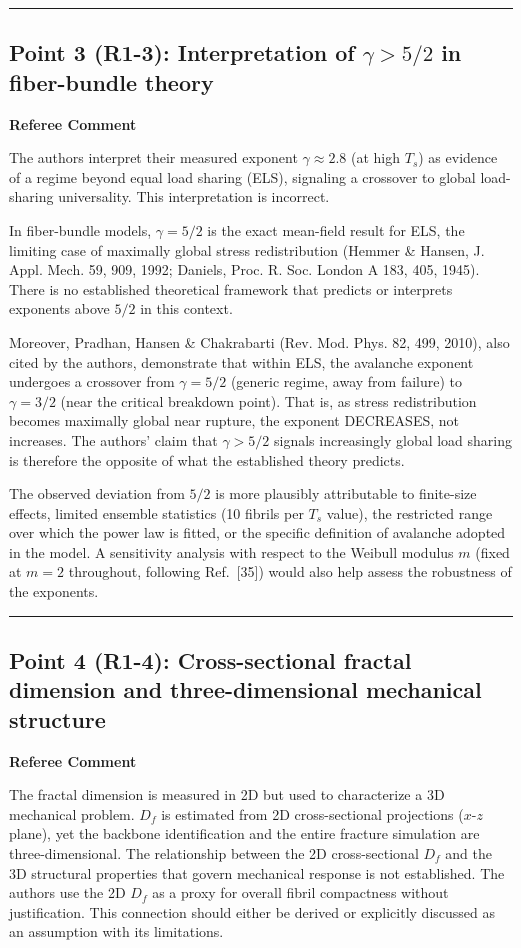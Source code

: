 \documentclass[11pt]{article}
\newenvironment{refereecomment}
  {%
    \par
    \begingroup
    \color{commentgray}
    \itshape
    \setlength{\leftskip}{1.4em}
    \setlength{\rightskip}{1.4em}
  }
  {%
    \par
    \endgroup
  }
\newcommand{\refereelabel}{%
  \par\smallskip
  {\color{commentgray}\bfseries Referee Comment}\par
}
\newcommand{\pointseparator}{%
  \par\bigskip
  {\color{rulegray}\hrule}
  \par\bigskip
}
\begin{document}
\pointseparator

\subsection*{Point 3 (R1-3): Interpretation of \(\gamma>5/2\) in fiber-bundle theory}

\refereelabel
\begin{refereecomment}
The authors interpret their measured exponent \(\gamma\approx2.8\) (at high
\(T_s\)) as evidence of a regime beyond equal load sharing (ELS), signaling a
crossover to global load-sharing universality. This interpretation is
incorrect.

In fiber-bundle models, \(\gamma=5/2\) is the exact mean-field result for ELS,
the limiting case of maximally global stress redistribution (Hemmer \& Hansen,
J. Appl. Mech. 59, 909, 1992; Daniels, Proc. R. Soc. London A 183, 405, 1945).
There is no established theoretical framework that predicts or interprets
exponents above \(5/2\) in this context.

Moreover, Pradhan, Hansen \& Chakrabarti (Rev. Mod. Phys. 82, 499, 2010), also
cited by the authors, demonstrate that within ELS, the avalanche exponent
undergoes a crossover from \(\gamma=5/2\) (generic regime, away from failure) to
\(\gamma=3/2\) (near the critical breakdown point). That is, as stress
redistribution becomes maximally global near rupture, the exponent DECREASES,
not increases. The authors' claim that \(\gamma>5/2\) signals increasingly
global load sharing is therefore the opposite of what the established theory
predicts.

The observed deviation from \(5/2\) is more plausibly attributable to
finite-size effects, limited ensemble statistics (10 fibrils per \(T_s\) value),
the restricted range over which the power law is fitted, or the specific
definition of avalanche adopted in the model. A sensitivity analysis with
respect to the Weibull modulus \(m\) (fixed at \(m=2\) throughout, following
Ref.~[35]) would also help assess the robustness of the exponents.
\end{refereecomment}

\pointseparator

\subsection*{Point 4 (R1-4): Cross-sectional fractal dimension and three-dimensional mechanical structure}

\refereelabel
\begin{refereecomment}
The fractal dimension is measured in 2D but used to characterize a 3D
mechanical problem. \(D_f\) is estimated from 2D cross-sectional projections
(\(x\)-\(z\) plane), yet the backbone identification and the entire fracture
simulation are three-dimensional. The relationship between the 2D
cross-sectional \(D_f\) and the 3D structural properties that govern mechanical
response is not established. The authors use the 2D \(D_f\) as a proxy for
overall fibril compactness without justification. This connection should
either be derived or explicitly discussed as an assumption with its
limitations.
\end{refereecomment}
\end{document}
